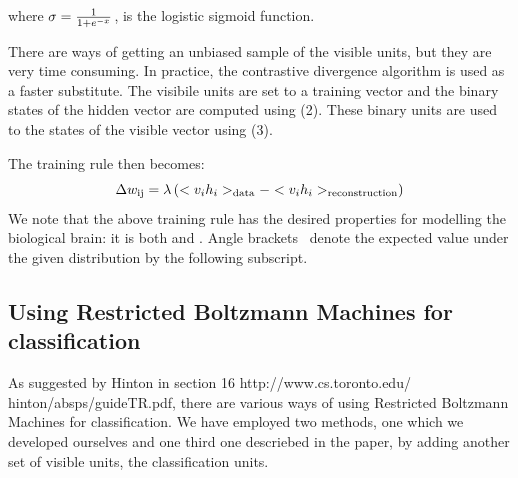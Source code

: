 where $\sigma = \frac{1}{1  + e^{- x}}^{}$, is the logistic sigmoid
function.

There are ways of getting an unbiased sample of the visible units, but they
are very time consuming. In practice, the contrastive divergence algorithm is
used as a faster substitute. The visibile units are set to a training vector
and the binary states of the hidden vector are computed using (2). These
binary units are used to  the states of the visible
vector using (3).

The training rule then becomes:
\[ \Delta w_{\operatorname{ij}} = \lambda \left( < v_i h_i >_{\operatorname{data}} - < v_i h_i
   >_{\operatorname{reconstruction}} \right) \]
We note that the above training rule has the desired properties for modelling
the biological brain: it is both  and .
Angle brackets \ denote the expected value under the given distribution by the
following subscript.



\subsection{Using Restricted Boltzmann Machines for classification}

As suggested by Hinton in section 16 http://www.cs.toronto.edu/\~{
}hinton/absps/guideTR.pdf, there are various ways of using Restricted
Boltzmann Machines for classification. We have employed two methods, one which
we developed ourselves and one third one descriebed in the paper, by adding
another set of visible units, the classification units.



